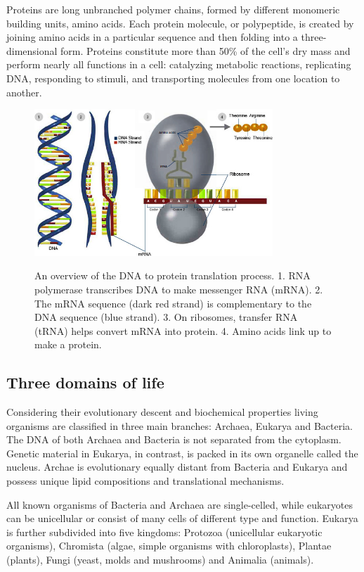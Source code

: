 \documentclass[11pt, a4paper,oneside]{report}
\begin{document}
Proteins are long unbranched polymer chains, formed by different monomeric building units, amino acids. Each protein molecule, or polypeptide, is created by joining amino acids in a particular sequence and then folding into a three-dimensional form. Proteins constitute more than 50\%  of the cell's dry mass \cite{Alberts2007} and perform nearly all functions in a cell: catalyzing metabolic reactions, replicating DNA, responding to stimuli, and transporting molecules from one location to another.
\begin{figure}[t]
\begin{center}
\label{img:dnatoprotein}
\includegraphics[width=0.8\textwidth]{figures/dna_to_protein.jpg}
\end{center}
\caption{An overview of the DNA to protein translation process. 1. RNA polymerase transcribes DNA to make messenger RNA (mRNA). 2. The mRNA sequence (dark red strand) is complementary to the DNA sequence (blue strand). 3. On ribosomes, transfer RNA (tRNA) helps convert mRNA into protein. 4. Amino acids link up to make a protein.} 
\end{figure}

\subsection{Three domains of life}
Considering their evolutionary descent and biochemical properties  living organisms are classified in three main branches: Archaea, Eukarya and Bacteria. The DNA of both Archaea and Bacteria is not separated from the cytoplasm. Genetic material in Eukarya, in contrast, is packed in its own organelle called the nucleus. Archae is evolutionary equally distant from Bacteria and Eukarya and possess unique lipid compositions and translational mechanisms. 

All known organisms of Bacteria and Archaea are single-celled, while eukaryotes can be unicellular or consist of many cells of different type and function. Eukarya is further subdivided into five kingdoms: Protozoa (unicellular eukaryotic organisms), Chromista (algae, simple organisms with chloroplasts), Plantae (plants), Fungi (yeast, molds and mushrooms) and Animalia (animals).    
\end{document}
